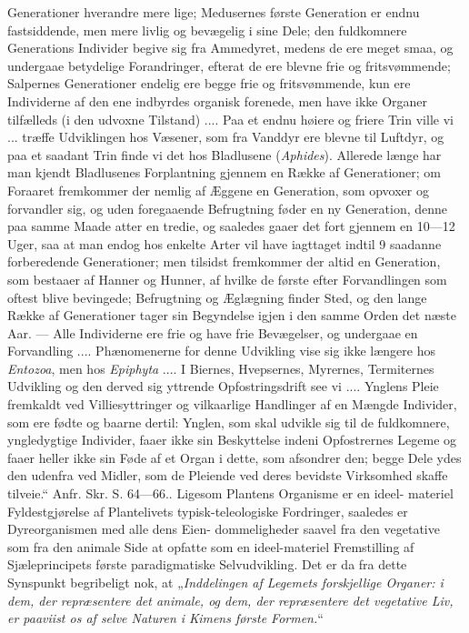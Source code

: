 \documentclass[12pt,a4paper]{book}
\begin{document}
{Generationer hverandre mere lige; Medusernes første Generation er endnu
fastsiddende, men mere livlig og bevægelig i sine Dele; den fuldkomnere
Generations Individer begive sig fra Ammedyret, medens de ere meget
smaa, og undergaae betydelige Forandringer, efterat de ere blevne frie og
fritsvømmende; Salpernes Generationer endelig ere begge frie og
fritsvømmende, kun ere Individerne af den ene indbyrdes organisk
forenede, men have ikke Organer tilfælleds (i den udvoxne Tilstand) ....
Paa et endnu høiere og friere Trin ville vi ... træffe Udviklingen hos
Væsener, som fra Vanddyr ere blevne til Luftdyr, og paa et saadant Trin
finde vi det hos Bladlusene (\textit{Aphides}). Allerede længe har man
kjendt Bladlusenes Forplantning gjennem en Række af Generationer; om
Foraaret fremkommer der nemlig af Æggene en Generation, som opvoxer og
forvandler sig, og uden foregaaende Befrugtning føder en ny Generation,
denne paa samme Maade atter en tredie, og saaledes gaaer det fort gjennem
en 10---12 Uger, saa at man endog hos enkelte Arter vil have iagttaget
indtil 9 saadanne forberedende Generationer; men tilsidst fremkommer der
altid en Generation, som bestaaer af Hanner og Hunner, af hvilke de
første efter Forvandlingen som oftest blive bevingede; Befrugtning og
Æglægning finder Sted, og den lange Række af Generationer tager sin
Begyndelse igjen i den samme Orden det næste Aar. --- Alle Individerne
ere frie og have frie Bevægelser, og undergaae en Forvandling ....
Phænomenerne for denne Udvikling vise sig ikke længere hos
\textit{Entozoa}, men hos \textit{Epiphyta} .... I Biernes, Hvepsernes,
Myrernes, Termiternes Udvikling og den derved sig yttrende
Opfostringsdrift see vi .... Ynglens Pleie fremkaldt ved Villiesyttringer
og vilkaarlige Handlinger af en Mængde Individer, som ere fødte og baarne
dertil: Ynglen, som skal udvikle sig til de fuldkomnere, yngledygtige
Individer, faaer ikke sin Beskyttelse indeni Opfostrernes Legeme og faaer
heller ikke sin Føde af et Organ i dette, som afsondrer den; begge Dele
ydes den udenfra ved Midler, som de Pleiende ved deres bevidste
Virksomhed skaffe tilveie.“ Anfr. Skr. S. 64---66.}. Ligesom Plantens
Organisme er en ideel-
materiel Fyldestgjørelse af Plantelivets typisk-teleologiske Fordringer,
saaledes er Dyreorganismen med alle dens Eien-
dommeligheder saavel fra den vegetative som fra den animale Side at
opfatte som en ideel-materiel Fremstilling af Sjæleprincipets første
paradigmatiske Selvudvikling. Det er da fra dette Synspunkt begribeligt
nok, at „\emph{Inddelingen af Legemets forskjellige Organer: i dem, der
repræsentere det animale, og dem, der repræsentere det vegetative Liv, er
paaviist os af selve Naturen i Kimens første Formen.}“
\end{document}
